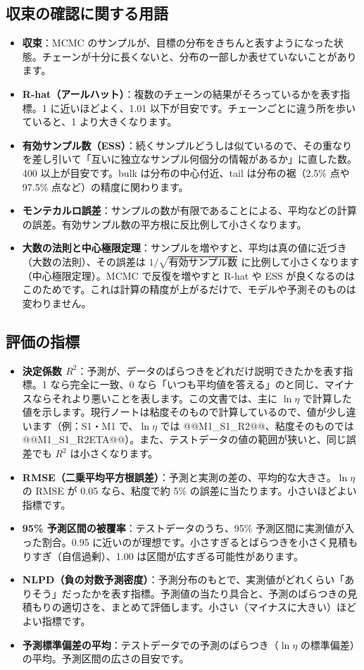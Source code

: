 \documentclass[paper=a4paper,fontsize=10.5pt,line_length=44zw,number_of_lines=38]{jlreq}
\newenvironment{termlist}{\begin{itemize}[label=・,leftmargin=1\zw,labelwidth=1\zw,labelsep=0pt,itemsep=0.4ex,topsep=0.6ex,parsep=0pt]}{\end{itemize}}
\newcommand{\term}[1]{\item \textbf{#1}：}
\begin{document}
\subsection{収束の確認に関する用語}
\begin{termlist}
\term{収束}MCMC のサンプルが、目標の分布をきちんと表すようになった状態。チェーンが十分に長くないと、分布の一部しか表せていないことがあります。
\term{R-hat（アールハット）}複数のチェーンの結果がそろっているかを表す指標。1 に近いほどよく、1.01 以下が目安です。チェーンごとに違う所を歩いていると、1 より大きくなります。
\term{有効サンプル数（ESS）}続くサンプルどうしは似ているので、その重なりを差し引いて「互いに独立なサンプル何個分の情報があるか」に直した数。400 以上が目安です。bulk は分布の中心付近、tail は分布の裾（2.5\% 点や 97.5\% 点など）の精度に関わります。
\term{モンテカルロ誤差}サンプルの数が有限であることによる、平均などの計算の誤差。有効サンプル数の平方根に反比例して小さくなります。
\term{大数の法則と中心極限定理}サンプルを増やすと、平均は真の値に近づき（大数の法則）、その誤差は $1/\sqrt{\text{有効サンプル数}}$ に比例して小さくなります（中心極限定理）。MCMC で反復を増やすと R-hat や ESS が良くなるのはこのためです。これは計算の精度が上がるだけで、モデルや予測そのものは変わりません。
\end{termlist}

\subsection{評価の指標}
\begin{termlist}
\term{決定係数 $R^2$}予測が、データのばらつきをどれだけ説明できたかを表す指標。1 なら完全に一致、0 なら「いつも平均値を答える」のと同じ、マイナスならそれより悪いことを表します。この文書では、主に $\ln\eta$ で計算した値を示します。現行ノートは粘度そのもので計算しているので、値が少し違います（例：S1・M1 で、$\ln\eta$ では @@M1_S1_R2@@、粘度そのものでは @@M1_S1_R2ETA@@）。また、テストデータの値の範囲が狭いと、同じ誤差でも $R^2$ は小さくなります。
\term{RMSE（二乗平均平方根誤差）}予測と実測の差の、平均的な大きさ。$\ln\eta$ の RMSE が 0.05 なら、粘度で約 5\% の誤差に当たります。小さいほどよい指標です。
\term{95\% 予測区間の被覆率}テストデータのうち、95\% 予測区間に実測値が入った割合。0.95 に近いのが理想です。小さすぎるとばらつきを小さく見積もりすぎ（自信過剰）、1.00 は区間が広すぎる可能性があります。
\term{NLPD（負の対数予測密度）}予測分布のもとで、実測値がどれくらい「ありそう」だったかを表す指標。予測値の当たり具合と、予測のばらつきの見積もりの適切さを、まとめて評価します。小さい（マイナスに大きい）ほどよい指標です。
\term{予測標準偏差の平均}テストデータでの予測のばらつき（$\ln\eta$ の標準偏差）の平均。予測区間の広さの目安です。
\end{termlist}
\end{document}
